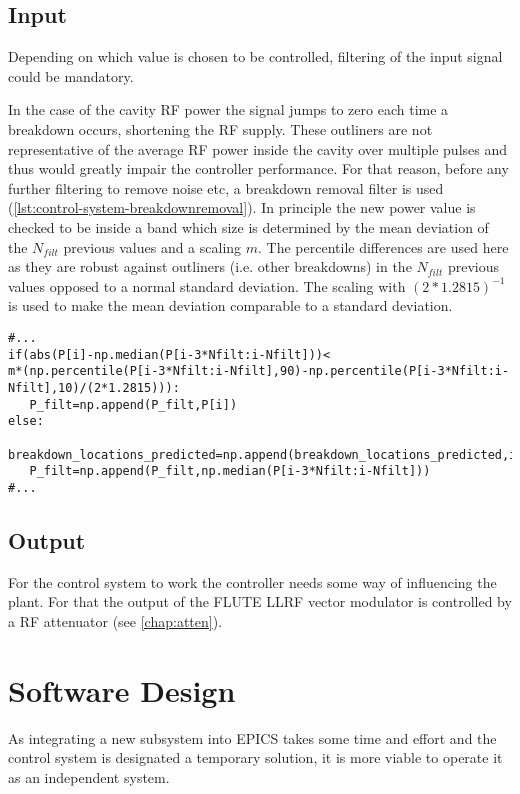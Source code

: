 \subsection{Input}
Depending on which value is chosen to be controlled, filtering of the input signal could be mandatory.

In the case of the cavity RF power the signal jumps to zero each time a breakdown occurs, shortening the RF supply. These outliners are not representative of the average RF power inside the cavity over multiple pulses and thus would greatly impair the controller performance. For that reason, before any further filtering to remove noise etc, a breakdown removal filter is used (\autoref{lst:control-system-breakdownremoval}). In principle the new power value is checked to be inside a band which size is determined by the mean deviation of the $N_{filt}$ previous values and a scaling $m$. The percentile differences are used here as they are robust against outliners (i.e. other breakdowns) in the $N_{filt}$ previous values opposed to a normal standard deviation. The scaling with $(2*1.2815)^{-1}$ is used to make the mean deviation comparable to a standard deviation.

\begin{lstlisting}[style=python,caption = Breakdown removal, label = lst:control-system-breakdownremoval]
#...
if(abs(P[i]-np.median(P[i-3*Nfilt:i-Nfilt]))<
m*(np.percentile(P[i-3*Nfilt:i-Nfilt],90)-np.percentile(P[i-3*Nfilt:i-Nfilt],10)/(2*1.2815))):
   P_filt=np.append(P_filt,P[i])
else:
   breakdown_locations_predicted=np.append(breakdown_locations_predicted,i)
   P_filt=np.append(P_filt,np.median(P[i-3*Nfilt:i-Nfilt]))
#...
\end{lstlisting}




\subsection{Output}
For the control system to work the controller needs some way of influencing the plant. For that the output of the FLUTE LLRF vector modulator is controlled by a RF attenuator (see \autoref{chap:atten}).

\section{Software Design}
As integrating a new subsystem into EPICS takes some time and effort and the control system is designated a temporary solution, it is more viable to operate it as an independent system.

